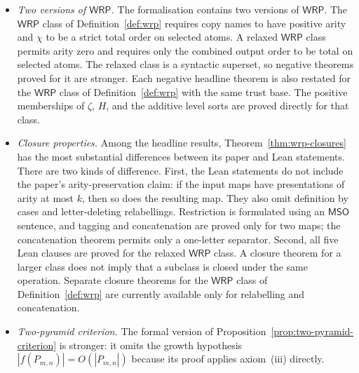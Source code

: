 \documentclass[11pt]{article}
\theoremstyle{definition}
\newcommand{\WRP}{\mathsf{WRP}}
\newcommand{\MSO}{\mathsf{MSO}}
\begin{document}
\begin{itemize}[leftmargin=*,itemsep=0.5em]
\item \emph{Two versions of $\WRP$.}
The formalisation contains two versions of $\WRP$.  The $\WRP$ class of
Definition~\ref{def:wrp} requires copy names to have positive arity and $\chi$
to be a strict total order on selected atoms.  A relaxed $\WRP$ class permits
arity zero and requires only the combined output order to be total on selected
atoms.  The relaxed class is a syntactic superset, so negative theorems proved
for it are stronger.  Each negative headline theorem is also restated for the
$\WRP$ class of Definition~\ref{def:wrp} with the same trust base.  The positive
memberships of $\zeta$, $H$, and the additive level sorts are proved directly
for that class.

\item \emph{Closure properties.}
Among the headline results, Theorem~\ref{thm:wrp-closures} has the most
substantial differences between its paper and Lean statements.  There are two
kinds of difference.  First, the Lean statements do not include the paper's
arity-preservation claim: if the input maps have presentations of arity at most
$k$, then so does the resulting map.  They also omit definition by cases and
letter-deleting relabellings.  Restriction is formulated using an $\MSO$
sentence, and tagging and concatenation are proved only for two maps; the
concatenation theorem permits only a one-letter separator.  Second, all five
Lean clauses are proved for the relaxed $\WRP$ class.  A closure theorem for a
larger class does not imply that a subclass is closed under the same operation.
Separate closure theorems for the $\WRP$ class of Definition~\ref{def:wrp} are
currently available only for relabelling and concatenation.

\item \emph{Two-pyramid criterion.}
The formal version of Proposition~\ref{prop:two-pyramid-criterion} is stronger:
it omits the growth hypothesis
$|f(P_{m,n})|=O(|P_{m,n}|)$ because its proof applies axiom~(iii) directly.


\end{itemize}
\end{document}
